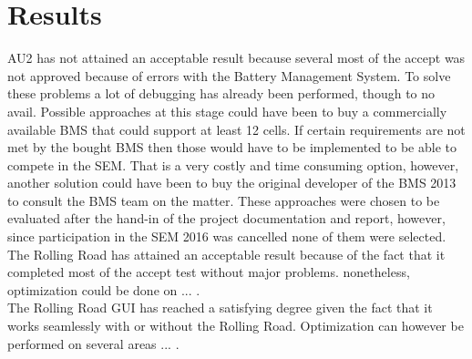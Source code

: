 \chapter{Results}
AU2 has not attained an acceptable result because several most of the accept was not approved because of errors with the Battery Management System. To solve these problems a lot of debugging has already been performed, though to no avail. Possible approaches at this stage could have been to buy a commercially available  BMS that could support at least 12 cells. If certain requirements are not met by the bought BMS then those would have to be implemented to be able to compete in the SEM. That is a very costly and time consuming option, however, another solution could have been to buy the original developer of the BMS 2013 to consult the BMS team on the matter. These approaches were chosen to be evaluated after the hand-in of the project documentation and report, however, since participation in the SEM 2016 was cancelled none of them were selected.\\
The Rolling Road has attained an acceptable result because of the fact that it completed most of the accept test without major problems. nonetheless, optimization could be done on ... .\\
The Rolling Road GUI has reached a satisfying degree given the fact that it works seamlessly with or without the Rolling Road. Optimization can however be performed on several areas ... .

